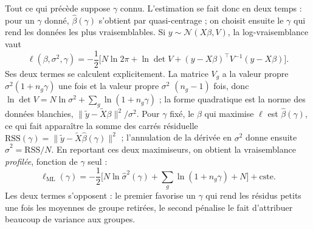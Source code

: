 \documentclass[11pt,a4paper]{article}
\begin{document}
Tout ce qui précède suppose $\gamma$ connu. L'estimation se fait donc en deux temps : pour un $\gamma$ donné,
$\hat\beta(\gamma)$ s'obtient par quasi-centrage ; on choisit ensuite le $\gamma$ qui rend les données les plus
vraisemblables. Si $y \sim \mathcal N(X\beta, V)$, la log-vraisemblance vaut
\[
\ell(\beta, \sigma^2, \gamma) = -\frac12\Big[N\ln 2\pi + \ln\det V + (y - X\beta)^\top V^{-1}(y - X\beta)\Big].
\]
Ses deux termes se calculent explicitement. La matrice $V_g$ a la valeur propre $\sigma^2(1 + n_g\gamma)$ une fois et
la valeur propre $\sigma^2$ $(n_g - 1)$ fois, donc $\ln\det V = N\ln\sigma^2 + \sum_g \ln(1 + n_g\gamma)$ ; la forme
quadratique est la norme des données blanchies, $\lVert \tilde y - \tilde X\beta \rVert^2/\sigma^2$. Pour $\gamma$
fixé, le $\beta$ qui maximise $\ell$ est $\hat\beta(\gamma)$, ce qui fait apparaître la somme des carrés résiduelle
$\mathrm{RSS}(\gamma) = \lVert\tilde y - \tilde X\hat\beta(\gamma)\rVert^2$ ; l'annulation de la dérivée en
$\sigma^2$ donne ensuite $\hat\sigma^2 = \mathrm{RSS}/N$. En reportant ces deux maximiseurs, on obtient la
vraisemblance \emph{profilée}, fonction de $\gamma$ seul :
\[
\ell_{\text{ML}}(\gamma) = -\frac12\Big[N\ln\hat\sigma^2(\gamma) + \sum_g\ln(1 + n_g\gamma) + N\Big] + \text{cste}.
\]
Les deux termes s'opposent : le premier favorise un $\gamma$ qui rend les résidus petits une fois les moyennes de
groupe retirées, le second pénalise le fait d'attribuer beaucoup de variance aux groupes.
\end{document}
